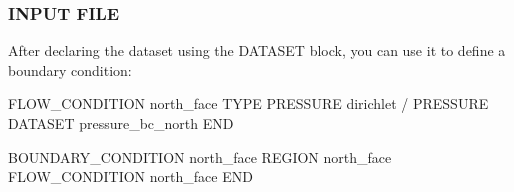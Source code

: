\documentclass{beamer}
\begin{document}
\begin{frame}\frametitle{INPUT FILE}

After declaring the dataset using the DATASET block, you can use it to
define a boundary condition:

\begin{semiverbatim}
FLOW_CONDITION north_face
  TYPE
    PRESSURE dirichlet
  /
  PRESSURE DATASET pressure_bc_north
END

BOUNDARY_CONDITION north_face
  REGION north_face
  FLOW_CONDITION north_face
END
\end{semiverbatim}


\end{frame}
\end{document}
